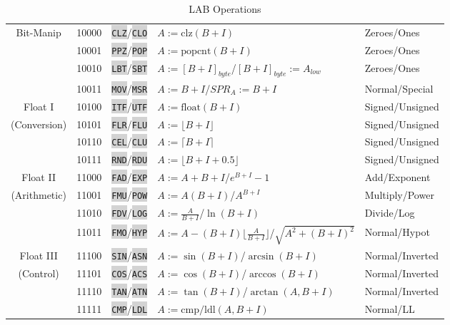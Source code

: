 \documentclass{article}
\newcommand{\labcode}[1]{\colorbox{lightgray}{\lstinline[language=lab]{#1}}}
\begin{document}
\begin{table}[h!]
\begin{tabular}{cclll}
    Bit-Manip   & 10000 & \labcode{CLZ}/\labcode{CLO} & $A := \mbox{clz}(B + I)$ & Zeroes/Ones \\
                & 10001 & \labcode{PPZ}/\labcode{POP} & $A := \mbox{popcnt}(B + I)$ & Zeroes/Ones \\
                & 10010 & \labcode{LBT}/\labcode{SBT} & $A := [B + I]_{byte}$/$[B + I]_{byte} := A_{low}$ & Zeroes/Ones \\ %
                & 10011 & \labcode{MOV}/\labcode{MSR} & $A := B + I$/$SPR_A := B + I$ & Normal/Special \\ \midrule
    Float I     & 10100 & \labcode{ITF}/\labcode{UTF} & $A := \mbox{float}(B + I)$ & Signed/Unsigned \\
    (Conversion)& 10101 & \labcode{FLR}/\labcode{FLU} & $A := \lfloor B + I \rfloor$ & Signed/Unsigned \\
                & 10110 & \labcode{CEL}/\labcode{CLU} & $A := \lceil B + I \rceil$ & Signed/Unsigned \\
                & 10111 & \labcode{RND}/\labcode{RDU} & $A := \lfloor B + I + 0.5 \rfloor$ & Signed/Unsigned \\ \midrule
    Float II    & 11000 & \labcode{FAD}/\labcode{EXP} & $A := A + B + I$/$e^{B+I} - 1$ & Add/Exponent \\
    (Arithmetic)& 11001 & \labcode{FMU}/\labcode{POW} & $A := A(B + I)$/$A^{B+I}$ & Multiply/Power \\
                & 11010 & \labcode{FDV}/\labcode{LOG} & $A := \frac{A}{B + I}$/$\ln(B + I)$ & Divide/Log \\
                & 11011 & \labcode{FMO}/\labcode{HYP} & $A := A - (B + I) \lfloor \frac{A}{B + I} \rfloor$/$\sqrt{A^2 + (B + I)^2}$ & Normal/Hypot \\ \midrule
    Float III   & 11100 & \labcode{SIN}/\labcode{ASN} & $A := \sin(B + I)$/$\arcsin(B + I)$ & Normal/Inverted \\
    (Control)   & 11101 & \labcode{COS}/\labcode{ACS} & $A := \cos(B + I)$/$\arccos(B + I)$ & Normal/Inverted \\
                & 11110 & \labcode{TAN}/\labcode{ATN} & $A := \tan(B + I)$/$\arctan(A, B + I)$ & Normal/Inverted \\
                & 11111 & \labcode{CMP}/\labcode{LDL} & $A := \mbox{cmp}/\mbox{ldl}(A,B+I)$ & Normal/LL \\ \midrule
\end{tabular}
\caption{LAB Operations}
\label{table:operations}
\end{table}
\end{document}

